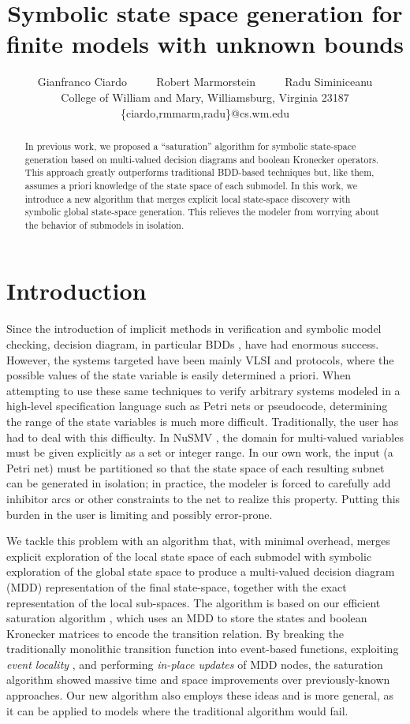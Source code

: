 \documentclass{article}
\title { Symbolic state space generation for \\
         finite models with unknown bounds
}
\author{ Gianfranco Ciardo ~~~~ Robert Marmorstein ~~~~ Radu Siminiceanu\\[2ex]
         College of William and Mary,
         Williamsburg, Virginia 23187  \\
         {\rm \{ciardo,rmmarm,radu\}@cs.wm.edu} }
\date{}
\begin{document}
\maketitle

\begin{abstract}
In previous work, we proposed a ``saturation'' algorithm
for symbolic state-space generation based on
multi-valued decision diagrams and boolean Kronecker operators.
This approach greatly outperforms traditional BDD-based techniques but, 
like them, assumes a priori knowledge of the state space of each submodel.
In this work, we introduce a new algorithm that merges explicit
local state-space discovery with symbolic global state-space generation.
This relieves the modeler from worrying about the behavior of submodels
in isolation.
\end{abstract}

\section{Introduction}\label{SEC:introduction}

Since the introduction of implicit methods in verification and symbolic
model checking, decision diagram, in particular
BDDs \cite{Bryant1986,Bryant1992,Burch1992}, have had enormous success. 
However, the systems targeted have been mainly VLSI and
protocols, where the possible values of the state variable is easily
determined a priori.
When attempting to use these same techniques to verify arbitrary
systems modeled in a high-level specification language such as
Petri nets or pseudocode, determining the range of the state variables is 
much more difficult.
Traditionally, the user has had to deal with this difficulty.
In NuSMV \cite{Cimatti1999NuSMV}, the domain for multi-valued variables
must be given explicitly as a set or integer range.
In our own work, the input (a Petri net) must be
partitioned so that the state space of
each resulting subnet can be generated in isolation;
in practice, the modeler is forced to carefully add
inhibitor arcs or other constraints to the net to realize this property.
Putting this burden in the user is limiting and possibly error-prone.

We tackle this problem with an algorithm that, with minimal overhead,
merges explicit exploration of the local state space of each submodel with
symbolic exploration of the global state space to produce a 
multi-valued decision diagram (MDD) \cite{Kam1998} representation of the 
final state-space, together with the exact representation of the local 
sub-spaces.  The algorithm is based on our efficient saturation algorithm
\cite{GFC-Saturation-2001}, which uses an MDD to store the states and 
boolean Kronecker matrices to encode the transition relation.
By breaking the traditionally monolithic transition function into 
event-based functions, exploiting \emph{event locality} 
\cite{GFC-MDD-improv-2000}, and performing \emph{in-place updates} of MDD 
nodes, the saturation algorithm showed massive time and space improvements 
over previously-known approaches. Our new algorithm also employs these 
ideas and is more general, as it can be applied to models where the 
traditional algorithm would fail.



\end{document}
